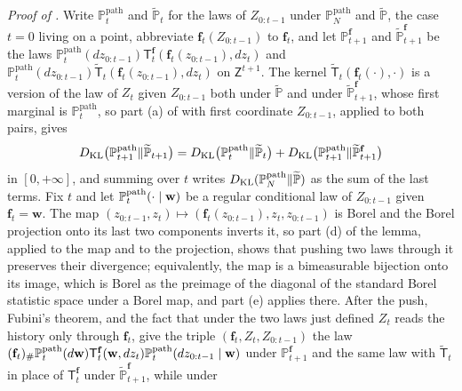 \noindent\emph{Proof of .}
Write $\mathbb P^{\mathrm{path}}_t$ and $\widetilde{\mathbb P}_t$ for the laws of
$Z_{0:t-1}$ under $\mathbb P^{\mathrm{path}}_N$ and $\widetilde{\mathbb P}$, the case
$t=0$ living on a point, abbreviate $\mathbf f_t(Z_{0:t-1})$ to $\mathbf f_t$, and let
$\mathbb P^{\mathbf f}_{t+1}$ and $\widetilde{\mathbb P}^{\mathbf f}_{t+1}$ be the laws
$\mathbb P^{\mathrm{path}}_t(dz_{0:t-1})\mathsf T^{\mathbf f}_t(\mathbf f_t(z_{0:t-1}),dz_t)$
and
$\mathbb P^{\mathrm{path}}_t(dz_{0:t-1})\widetilde{\mathsf T}_t(\mathbf f_t(z_{0:t-1}),dz_t)$
on $\mathsf Z^{t+1}$. The kernel $\widetilde{\mathsf T}_t(\mathbf f_t(\cdot),\cdot)$ is a
version of the law of $Z_t$ given $Z_{0:t-1}$ both under $\widetilde{\mathbb P}$ and
under $\widetilde{\mathbb P}^{\mathbf f}_{t+1}$, whose first marginal is
$\mathbb P^{\mathrm{path}}_t$, so part (a) of  with first
coordinate $Z_{0:t-1}$, applied to both pairs, gives
\begin{equation*}
D_{\mathrm{KL}}\bigl(\mathbb P^{\mathrm{path}}_{t+1}\Vert\widetilde{\mathbb P}_{t+1}\bigr)
=D_{\mathrm{KL}}\bigl(\mathbb P^{\mathrm{path}}_t\Vert\widetilde{\mathbb P}_t\bigr)
+D_{\mathrm{KL}}\bigl(\mathbb P^{\mathrm{path}}_{t+1}\Vert\widetilde{\mathbb P}^{\mathbf f}_{t+1}\bigr)
\end{equation*}
in $[0,+\infty]$, and summing over $t$ writes
$D_{\mathrm{KL}}(\mathbb P^{\mathrm{path}}_N\Vert\widetilde{\mathbb P})$ as the sum of the last
terms. Fix $t$ and let $\mathbb P^{\mathrm{path}}_t(\cdot\mid\mathbf w)$ be a regular
conditional law of $Z_{0:t-1}$ given $\mathbf f_t=\mathbf w$. The map
$(z_{0:t-1},z_t)\mapsto(\mathbf f_t(z_{0:t-1}),z_t,z_{0:t-1})$ is Borel and the Borel
projection onto its last two components inverts it, so part (d) of the lemma, applied
to the map and to the projection, shows that pushing two laws through it preserves
their divergence; equivalently, the map is a bimeasurable bijection onto its image,
which is Borel as the preimage of the diagonal of the standard Borel statistic space
under a Borel map, and part (e) applies there. After the push, Fubini's theorem, and
the fact that under the two laws just defined $Z_t$ reads the history only through
$\mathbf f_t$, give the triple $(\mathbf f_t,Z_t,Z_{0:t-1})$ the law
$(\mathbf f_t)_\#\mathbb P^{\mathrm{path}}_t(d\mathbf w)\mathsf T^{\mathbf
f}_t(\mathbf w,dz_t)\mathbb P^{\mathrm{path}}_t(dz_{0:t-1}\mid\mathbf w)$ under
$\mathbb P^{\mathbf f}_{t+1}$ and the same law with $\widetilde{\mathsf T}_t$ in place
of $\mathsf T^{\mathbf f}_t$ under $\widetilde{\mathbb P}^{\mathbf f}_{t+1}$, while under
